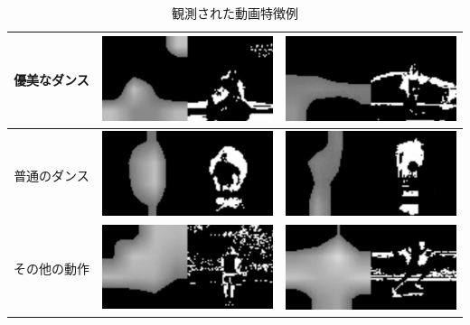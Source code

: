 \begin{table}[t]
  \begin{center}
    \begin{tabular}{|c|cc|} \hline
      優美なダンス
        & \includegraphics[width=50mm]{images/cam/chinese.png}
        & \includegraphics[width=50mm]{images/cam/japanese.png}
      \\ \hline
      普通のダンス
        & \includegraphics[width=50mm]{images/cam/kadokawa.png}
        & \includegraphics[width=50mm]{images/cam/aito.png}
      \\ \hline
      その他の動作
        & \includegraphics[width=50mm]{images/cam/radio.png}
        & \includegraphics[width=50mm]{images/cam/running.png}
      \\ \hline
    \end{tabular}
  \end{center}
  \caption{観測された動画特徴例}
  \label{examples}
\end{table}

